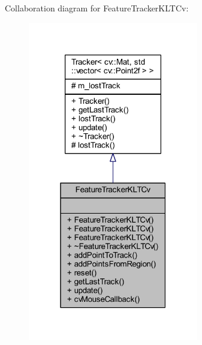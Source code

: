 Collaboration diagram for Feature\+Tracker\+K\+L\+T\+Cv\+:
\nopagebreak
\begin{figure}[H]
\begin{center}
\leavevmode
\includegraphics[width=211pt]{class_viscv_1_1_feature_tracker_k_l_t_cv__coll__graph}
\end{center}
\end{figure}

